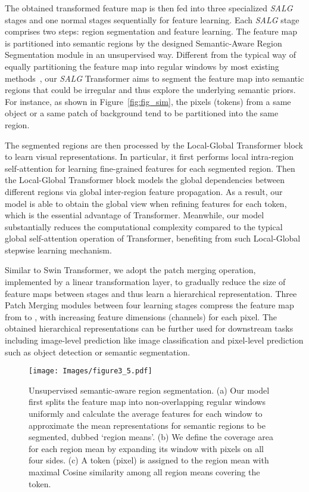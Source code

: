 The obtained transformed feature map is then fed into three specialized \emph{SALG} stages and one normal stages sequentially for feature learning. Each \emph{SALG} stage comprises two steps: region segmentation and feature learning. The feature map is partitioned into semantic regions by the designed Semantic-Aware Region Segmentation module in an unsupervised way. Different from the typical way of equally partitioning the feature map into regular windows by most existing methods~\cite{liu2021swin,chen2021regionvit,chu2021twins,vaswani2021scaling,huang2021shuffle,fang2022msg}, our \emph{SALG} Transformer aims to segment the feature map into semantic regions that could be irregular and thus explore the underlying semantic priors. For instance, as shown in Figure~\ref{fig:fig_sim}, the pixels (tokens) from a same object or a same patch of background tend to be partitioned into the same region. 


The segmented regions are then processed by the Local-Global Transformer block to learn visual representations. In particular, it first performs local intra-region self-attention for learning fine-grained features for each segmented region. Then the Local-Global Transformer block models the global dependencies between different regions via global inter-region feature propagation. As a result, our model is able to obtain the global view when refining features for each token, which is the essential advantage of Transformer. Meanwhile, our model substantially reduces the computational complexity compared to the typical global self-attention operation of Transformer, benefiting from such Local-Global stepwise learning mechanism.

Similar to Swin Transformer, we adopt the patch merging operation, implemented by a linear transformation layer, to gradually reduce the size of feature maps between stages and thus learn a hierarchical representation. Three Patch Merging modules between four learning stages compress the feature map from  to , with increasing feature dimensions (channels) for each pixel. The obtained hierarchical representations can be further used for downstream tasks including image-level prediction like image classification and pixel-level prediction such as object detection or semantic segmentation.

\begin{figure*}[!t]
\centering
\texttt{[image: Images/figure3\_5.pdf]}
\caption{Unsupervised semantic-aware region segmentation. (a) Our model first splits the feature map into non-overlapping regular windows uniformly and calculate the average features for each window to approximate the mean representations for semantic regions to be segmented, dubbed `region means'. (b) We define the coverage area for each region mean by expanding its window with  pixels on all four sides. (c) A token (pixel) is assigned to the region mean with maximal Cosine similarity among all region means covering the token.}
\label{fig:fig_seg}
\end{figure*}

